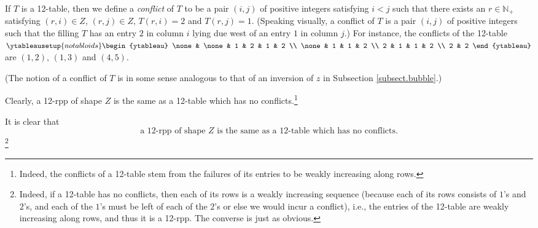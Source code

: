 \documentclass[numbers=enddot,12pt,final,onecolumn,notitlepage]{scrartcl}%
\theoremstyle{definition}
\newenvironment{verlong}{}{}
\newenvironment{vershort}{}{}
\begin{document}
If $T$ is a 12-table, then we define a \textit{conflict} of $T$ to be a pair
$\left(  i,j\right)  $ of positive integers satisfying $i<j$ such that there
exists an $r\in\mathbb{N}_{+}$ satisfying $\left(  r,i\right)  \in Z$,
$\left(  r,j\right)  \in Z$, $T\left(  r,i\right)  =2$ and $T\left(
r,j\right)  =1$. (Speaking visually, a conflict of $T$ is a pair $\left(
i,j\right)  $ of positive integers such that the filling $T$ has an entry $2$
in column $i$ lying due west of an entry $1$ in column $j$.) For instance, the
conflicts of the 12-table $%
\ytableausetup{notabloids}
\begin{ytableau}
\none& \none& 1 & 2 & 1 & 2 \\
\none& 1 & 1 & 2 \\
2 & 1 & 1 & 2 \\
2 & 2
\end{ytableau}%
$ are $\left(  1,2\right)  $, $\left(  1,3\right)  $ and $\left(  4,5\right)
$.

(The notion of a conflict of $T$ is in some sense analogous to that of an
inversion of $z$ in Subsection \ref{subsect.bubble}.)

\begin{vershort}
Clearly, a 12-rpp of shape $Z$ is the same as a 12-table which has no
conflicts.\footnote{Indeed, the conflicts of a 12-table stem from the failures
of its entries to be weakly increasing along rows.}
\end{vershort}

\begin{verlong}
It is clear that%
\begin{equation}
\text{a 12-rpp of shape }Z\text{ is the same as a 12-table which has no
conflicts.} \label{pf.lem.BK.no-conflicts}%
\end{equation}
\footnote{Indeed, if a 12-table has no conflicts, then each of its rows is a
weakly increasing sequence (because each of its rows consists of $1$'s and
$2$'s, and each of the $1$'s must be left of each of the $2$'s or else we
would incur a conflict), i.e., the entries of the 12-table are weakly
increasing along rows, and thus it is a 12-rpp. The converse is just as
obvious.}
\end{verlong}
\end{document}

